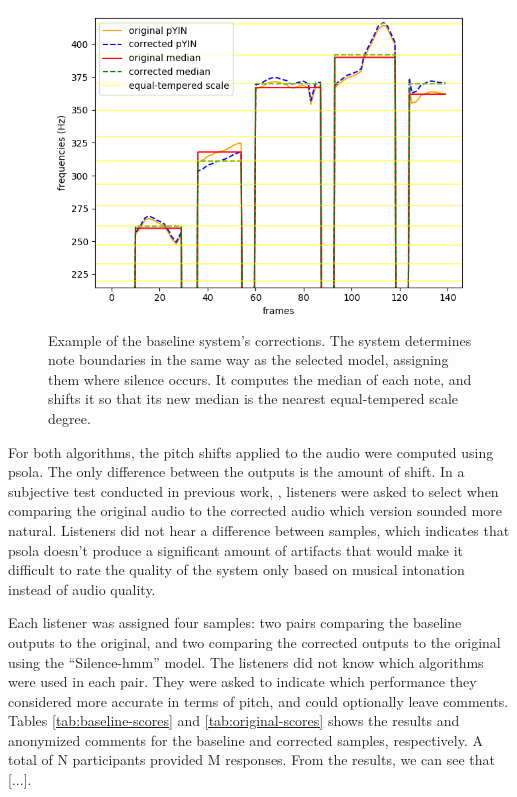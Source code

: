 \begin{figure}[t]
    \centering
    \includegraphics[width=\columnwidth]{figures/baseline_tuning.png}
    \caption{Example of the baseline system's corrections. The system determines note boundaries in the same way as the selected model, assigning them where silence occurs. It computes the median of each note, and shifts it so that its new median is the nearest equal-tempered scale degree.}
    \label{fig:baseline_tuning}
\end{figure}

For both algorithms, the pitch shifts applied to the audio were computed using \gls{psola}. The only difference between the outputs is the amount of shift. In a subjective test conducted in previous work, \cite{wager2020deep}, listeners were asked to select when comparing the original audio to the corrected audio which version sounded more natural. Listeners did not hear a difference between samples, which indicates that \gls{psola} doesn't produce a significant amount of artifacts that would make it difficult to rate the quality of the system only based on musical intonation instead of audio quality.

Each listener was assigned four samples: two pairs comparing the baseline outputs to the original, and two comparing the corrected outputs to the original using the ``Silence-\gls{hmm}'' model. The listeners did not know which algorithms were used in each pair. They were asked to indicate which performance they considered more accurate in terms of pitch, and could optionally leave comments. Tables \ref{tab:baseline-scores} and \ref{tab:original-scores} shows the results and anonymized comments for the baseline and corrected samples, respectively. A total of N participants provided M responses. From the results, we can see that [...].

